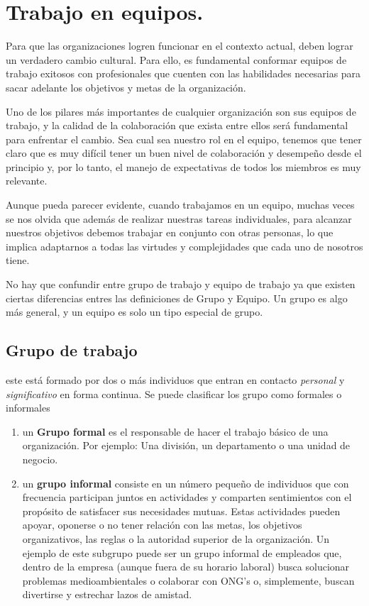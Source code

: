 \newpage
\section{Trabajo en equipos.}
Para que las organizaciones logren funcionar en el contexto actual, 
deben lograr un verdadero cambio cultural. Para ello, es fundamental
conformar equipos de trabajo exitosos con profesionales que
cuenten con las habilidades necesarias para sacar adelante los
objetivos y metas de la organización.

Uno de los pilares más importantes de cualquier organización son sus
equipos de trabajo, y la calidad de la colaboración que exista entre
ellos será fundamental para enfrentar el cambio. Sea cual sea
nuestro rol en el equipo, tenemos que tener claro que es muy difícil
tener un buen nivel de colaboración y desempeño desde el principio y,
por lo tanto, el manejo de expectativas de todos los miembros es muy
relevante.

Aunque pueda parecer evidente, cuando trabajamos en un equipo,
muchas veces se nos olvida que además de realizar nuestras tareas
individuales, para alcanzar nuestros objetivos debemos trabajar en
conjunto con otras personas, lo que implica adaptarnos a todas las
virtudes y complejidades que cada uno de nosotros tiene.

No hay que confundir entre grupo de trabajo y equipo de trabajo
ya que existen ciertas diferencias entres las definiciones de
Grupo y Equipo. Un grupo es algo más general, y un equipo es solo
un tipo especial de grupo.

\subsection{Grupo de trabajo}
este está formado por dos o más individuos que
entran en contacto \textit{personal} y \textit{significativo} en
forma continua. Se puede clasificar los grupo como formales o
informales

\begin{enumerate}
    \item un \textbf{Grupo formal} es el responsable de hacer el
    trabajo básico de una organización. Por ejemplo: Una división,
    un departamento o una unidad de negocio.

    \item un \textbf{grupo informal} consiste en un número pequeño
    de individuos que con frecuencia participan juntos en
    actividades y comparten sentimientos con el propósito de
    satisfacer sus necesidades mutuas. Estas actividades pueden
    apoyar, oponerse o no tener relación con las metas,
    los objetivos organizativos, las reglas o la autoridad superior
    de la organización. Un ejemplo de este subgrupo puede ser un
    grupo informal de empleados que, dentro de la empresa (aunque
    fuera de su horario laboral) busca solucionar problemas
    medioambientales o colaborar con ONG's o, simplemente, buscan
    divertirse y estrechar lazos de amistad.
\end{enumerate}

